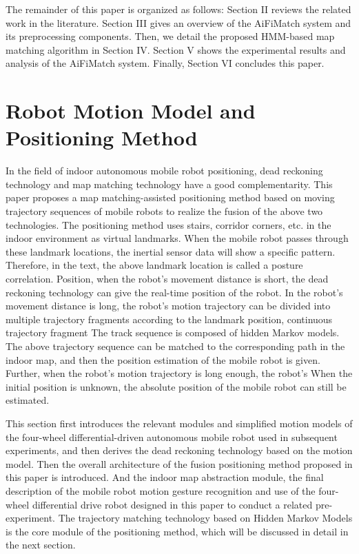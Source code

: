 \documentclass{llncs}
\begin{document}
The remainder of this paper is organized as follows: Section II reviews the related work in the literature. Section III gives an overview of the AiFiMatch system and its preprocessing components. Then, we detail the proposed HMM-based map matching algorithm in Section IV. Section V shows the experimental results and analysis of the AiFiMatch system. Finally, Section VI concludes this paper.

\section{Robot Motion Model and Positioning Method}

In the field of indoor autonomous mobile robot positioning, dead reckoning technology and map matching technology have a good complementarity. This paper proposes a map matching-assisted positioning method based on moving trajectory sequences of mobile robots to realize the fusion of the above two technologies. The positioning method uses stairs, corridor corners, etc. in the indoor environment as virtual landmarks. When the mobile robot passes through these landmark locations, the inertial sensor data will show a specific pattern. Therefore, in the text, the above landmark location is called a posture correlation. Position, when the robot's movement distance is short, the dead reckoning technology can give the real-time position of the robot. In the robot's movement distance is long, the robot's motion trajectory can be divided into multiple trajectory fragments according to the landmark position, continuous trajectory fragment The track sequence is composed of hidden Markov models. The above trajectory sequence can be matched to the corresponding path in the indoor map, and then the position estimation of the mobile robot is given. Further, when the robot's motion trajectory is long enough, the robot's When the initial position is unknown, the absolute position of the mobile robot can still be estimated.

This section first introduces the relevant modules and simplified motion models of the four-wheel differential-driven autonomous mobile robot used in subsequent experiments, and then derives the dead reckoning technology based on the motion model. Then the overall architecture of the fusion positioning method proposed in this paper is introduced. And the indoor map abstraction module, the final description of the mobile robot motion gesture recognition and use of the four-wheel differential drive robot designed in this paper to conduct a related pre-experiment. The trajectory matching technology based on Hidden Markov Models is the core module of the positioning method, which will be discussed in detail in the next section.
\end{document}
